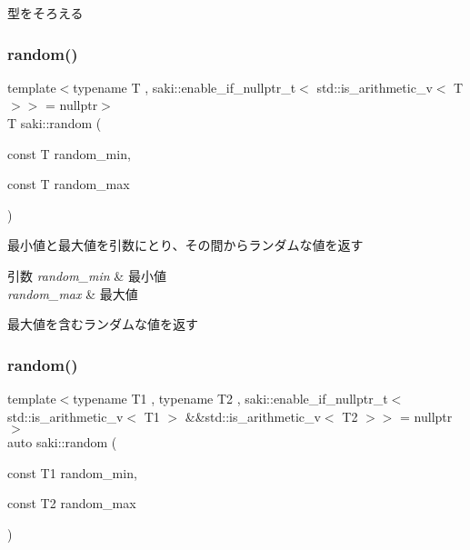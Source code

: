 型をそろえる 

\mbox{\label{namespacesaki_adec39fdef417fa75fb6a6bd06b08490c}} 
\subsubsection{\texorpdfstring{random()}{random()}\hspace{0.1cm}{\footnotesize\ttfamily [1/2]}}
{\footnotesize\ttfamily template$<$typename T , saki\+::enable\+\_\+if\+\_\+nullptr\+\_\+t$<$ std\+::is\+\_\+arithmetic\+\_\+v$<$ T $>$$>$  = nullptr$>$ \\
T saki\+::random (\begin{DoxyParamCaption}\item[{const T}]{random\+\_\+min,  }\item[{const T}]{random\+\_\+max }\end{DoxyParamCaption})}



最小値と最大値を引数にとり、その間からランダムな値を返す 


\begin{DoxyParams}{引数}
{\em random\+\_\+min} & 最小値 \\
\hline
{\em random\+\_\+max} & 最大値\\
\hline
\end{DoxyParams}
最大値を含むランダムな値を返す \mbox{\label{namespacesaki_a8a3d0c8d244f1f8e5c6c8310f7e7b647}} 
\subsubsection{\texorpdfstring{random()}{random()}\hspace{0.1cm}{\footnotesize\ttfamily [2/2]}}
{\footnotesize\ttfamily template$<$typename T1 , typename T2 , saki\+::enable\+\_\+if\+\_\+nullptr\+\_\+t$<$ std\+::is\+\_\+arithmetic\+\_\+v$<$ T1 $>$ \&\&std\+::is\+\_\+arithmetic\+\_\+v$<$ T2 $>$$>$  = nullptr$>$ \\
auto saki\+::random (\begin{DoxyParamCaption}\item[{const T1}]{random\+\_\+min,  }\item[{const T2}]{random\+\_\+max }\end{DoxyParamCaption})}

